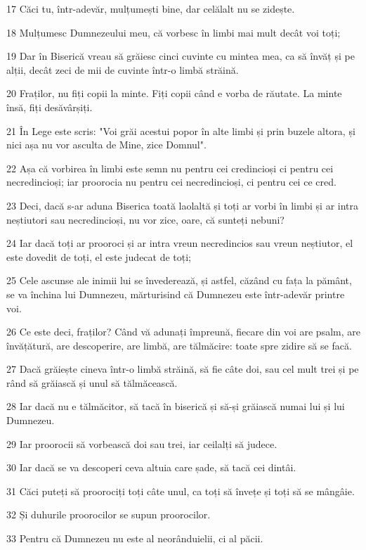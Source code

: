 \par 17 Căci tu, într-adevăr, mulțumești bine, dar celălalt nu se zidește.
\par 18 Mulțumesc Dumnezeului meu, că vorbesc în limbi mai mult decât voi toți;
\par 19 Dar în Biserică vreau să grăiesc cinci cuvinte cu mintea mea, ca să învăț și pe alții, decât zeci de mii de cuvinte într-o limbă străină.
\par 20 Fraților, nu fiți copii la minte. Fiți copii când e vorba de răutate. La minte însă, fiți desăvârșiți.
\par 21 În Lege este scris: "Voi grăi acestui popor în alte limbi și prin buzele altora, și nici așa nu vor asculta de Mine, zice Domnul".
\par 22 Așa că vorbirea în limbi este semn nu pentru cei credincioși ci pentru cei necredincioși; iar proorocia nu pentru cei necredincioși, ci pentru cei ce cred.
\par 23 Deci, dacă s-ar aduna Biserica toată laolaltă și toți ar vorbi în limbi și ar intra neștiutori sau necredincioși, nu vor zice, oare, că sunteți nebuni?
\par 24 Iar dacă toți ar prooroci și ar intra vreun necredincios sau vreun neștiutor, el este dovedit de toți, el este judecat de toți;
\par 25 Cele ascunse ale inimii lui se învederează, și astfel, căzând cu fața la pământ, se va închina lui Dumnezeu, mărturisind că Dumnezeu este într-adevăr printre voi.
\par 26 Ce este deci, fraților? Când vă adunați împreună, fiecare din voi are psalm, are învățătură, are descoperire, are limbă, are tălmăcire: toate spre zidire să se facă.
\par 27 Dacă grăiește cineva într-o limbă străină, să fie câte doi, sau cel mult trei și pe rând să grăiască și unul să tălmăcească.
\par 28 Iar dacă nu e tălmăcitor, să tacă în biserică și să-și grăiască numai lui și lui Dumnezeu.
\par 29 Iar proorocii să vorbească doi sau trei, iar ceilalți să judece.
\par 30 Iar dacă se va descoperi ceva altuia care șade, să tacă cei dintâi.
\par 31 Căci puteți să proorociți toți câte unul, ca toți să învețe și toți să se mângâie.
\par 32 Și duhurile proorocilor se supun proorocilor.
\par 33 Pentru că Dumnezeu nu este al neorânduielii, ci al păcii.
